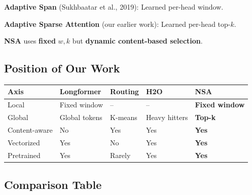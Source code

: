 \textbf{Adaptive Span} (Sukhbaatar et al., 2019): Learned per-head window.

\textbf{Adaptive Sparse Attention} (our earlier work): Learned per-head top-$k$.

\textbf{NSA} uses \textbf{fixed} $w, k$ but \textbf{dynamic content-based selection}.

\subsection{Position of Our Work}

\begin{table}[H]
\centering
\small
\begin{tabular}{lllll}
\toprule
\textbf{Axis} & \textbf{Longformer} & \textbf{Routing} & \textbf{H2O} & \textbf{NSA} \\
\midrule
Local & Fixed window & -- & -- & \textbf{Fixed window} \\
Global & Global tokens & K-means & Heavy hitters & \textbf{Top-k} \\
Content-aware & No & Yes & Yes & \textbf{Yes} \\
Vectorized & Yes & No & Yes & \textbf{Yes} \\
Pretrained & Yes & Rarely & Yes & \textbf{Yes} \\
\bottomrule
\end{tabular}
\end{table}

\subsection{Comparison Table}

